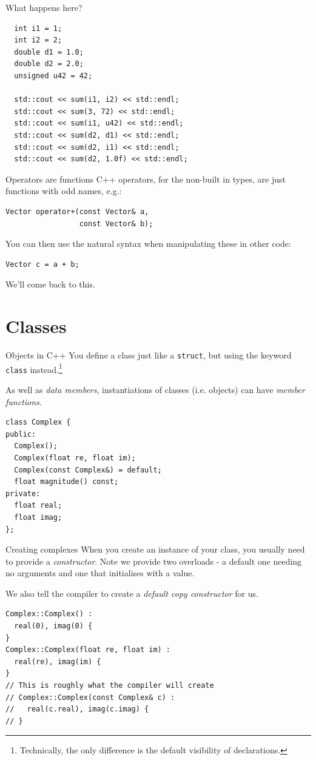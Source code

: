 \documentclass[presentation,t]{beamer}
\newcommand{\code}[1]{\lstinline!#1!}
\begin{document}
\begin{frame}[fragile]{What happens here?}
\begin{lstlisting}
  int i1 = 1;
  int i2 = 2;
  double d1 = 1.0;
  double d2 = 2.0;
  unsigned u42 = 42;
  
  std::cout << sum(i1, i2) << std::endl;
  std::cout << sum(3, 72) << std::endl;
  std::cout << sum(i1, u42) << std::endl;
  std::cout << sum(d2, d1) << std::endl;
  std::cout << sum(d2, i1) << std::endl;
  std::cout << sum(d2, 1.0f) << std::endl;
\end{lstlisting}
\end{frame}

\begin{frame}[fragile]{Operators are functions}
  C++ operators, for the non-built in types, are just functions with
  odd names, e.g.:
\begin{lstlisting}
Vector operator+(const Vector& a,
                 const Vector& b);
\end{lstlisting}
  You can then use the natural syntax when manipulating these in other
  code:
\begin{lstlisting}
Vector c = a + b;
\end{lstlisting}
  We'll come back to this.
\end{frame}

\section{Classes}
\begin{frame}[fragile]{Objects in C++}
  You define a class just like a \code{struct}, but using the keyword
  \code{class} instead.\footnote{Technically, the only difference is
    the default visibility of declarations.}
  
  As well as \emph{data members}, instantiations of classes
  (i.e. objects) can have \emph{member functions}.

\begin{lstlisting}
class Complex {
public:
  Complex();
  Complex(float re, float im);
  Complex(const Complex&) = default;
  float magnitude() const;
private:
  float real;
  float imag;
};
\end{lstlisting}
\end{frame}

\begin{frame}[fragile]{Creating complexes}
  When you create an instance of your class, you usually need to
  provide a \emph{constructor}. Note we provide two overloads - a
  default one needing no arguments and one that initialises with a
  value.

  We also tell the compiler to create a \emph{default copy
    constructor} for us.

\begin{lstlisting}
Complex::Complex() :
  real(0), imag(0) {
}
Complex::Complex(float re, float im) :
  real(re), imag(im) {
}
// This is roughly what the compiler will create
// Complex::Complex(const Complex& c) :
//   real(c.real), imag(c.imag) {
// }

\end{lstlisting}
\end{frame}
\end{document}
